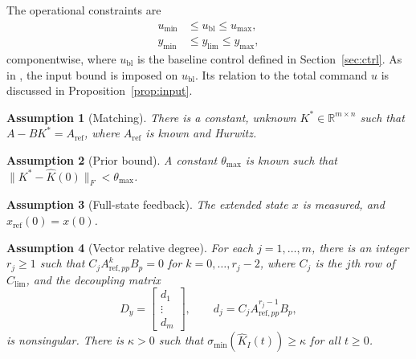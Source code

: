 \documentclass[lettersize,journal]{IEEEtran}
\newtheorem{assumption}{Assumption}
\newcommand{\Kh}{\hat{K}}
\newcommand{\xr}{x_{\mathrm{ref}}}
\newcommand{\Ar}{A_{\mathrm{ref}}}
\newcommand{\App}{A_{\mathrm{ref},pp}}
\newcommand{\ub}{u_{\mathrm{bl}}}
\newcommand{\Clim}{C_{\mathrm{lim}}}
\newcommand{\ylim}{y_{\mathrm{lim}}}
\newcommand{\tmax}{\theta_{\max}}
\newcommand{\R}{\mathbb{R}}
\begin{document}
The operational constraints are
\begin{align}
u_{\min} &\le \ub \le u_{\max}, \label{eq:ucon}\\
y_{\min} &\le \ylim \le y_{\max}, \label{eq:ycon}
\end{align}
componentwise, where $\ub$ is the baseline control defined in Section~\ref{sec:ctrl}. As in \cite{lavretsky2025}, the input bound is imposed on $\ub$. Its relation to the total command $u$ is discussed in Proposition~\ref{prop:input}.

\begin{assumption}[Matching] \label{as:match}
There is a constant, unknown $K^*\in\R^{m\times n}$ such that $A-BK^*=\Ar$, where $\Ar$ is known and Hurwitz.
\end{assumption}

\begin{assumption}[Prior bound] \label{as:bound}
A constant $\tmax$ is known such that $\|K^*-\Kh(0)\|_F<\tmax$.
\end{assumption}

\begin{assumption}[Full-state feedback] \label{as:meas}
The extended state $x$ is measured, and $\xr(0)=x(0)$.
\end{assumption}

\begin{assumption}[Vector relative degree] \label{as:reldeg}
For each $j=1,\dots,m$, there is an integer $r_j\ge1$ such that $C_j\App^kB_p=0$ for $k=0,\dots,r_j-2$, where $C_j$ is the $j$th row of $\Clim$, and the decoupling matrix
\begin{equation}
D_y=\begin{bmatrix}d_1\\ \vdots\\ d_m\end{bmatrix},\qquad d_j=C_j\App^{r_j-1}B_p, \label{eq:Dy}
\end{equation}
is nonsingular. There is $\kappa>0$ such that $\sigma_{\min}(\Kh_I(t))\ge\kappa$ for all $t\ge0$.
\end{assumption}
\end{document}
